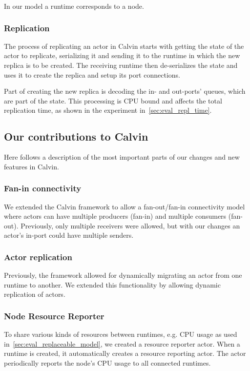 \documentclass{cslthse-msc}
\begin{document}
In our model a runtime corresponds to a node.

\subsubsection{Replication} \label{subsec:calvin_replication}
The process of replicating an actor in Calvin starts with getting the state of the actor to replicate, serializing it and sending it to the runtime in which the new replica is to be created. The receiving runtime then de-serializes the state and uses it to create the replica and setup its port connections.

Part of creating the new replica is decoding the in- and out-ports' queues, which are part of the state. This processing is CPU bound and affects the total replication time, as shown in the experiment in~\cref{sec:eval_repl_time}.

\subsection{Our contributions to Calvin} \label{subsec:design_contributions} %
Here follows a description of the most important parts of our changes and new features in Calvin.

\subsubsection{Fan-in connectivity}
We extended the Calvin framework to allow a fan-out/fan-in connectivity model where actors can have multiple producers (fan-in) and multiple consumers (fan-out). Previously, only multiple receivers were allowed, but with our changes an actor's in-port could have multiple senders.

\subsubsection{Actor replication}
Previously, the framework allowed for dynamically migrating an actor from one runtime to another. We extended this functionality by allowing dynamic replication of actors. 

\subsubsection{Node Resource Reporter}
To share various kinds of resources between runtimes, e.g. CPU usage as used in~\cref{sec:eval_replaceable_model}, we created a resource reporter actor. When a runtime is created, it automatically creates a resource reporting actor. The actor periodically reports the node's CPU usage to all connected runtimes. 
\end{document}
